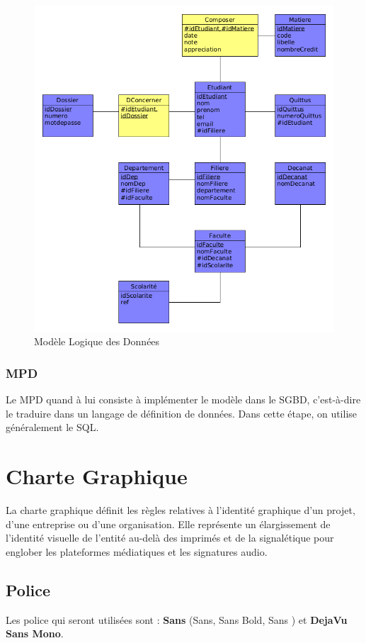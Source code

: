 \documentclass[12pt,a4paper]{article}
\begin{document}
	\begin{figure}[H]
		\centering
		\includegraphics[width=\textwidth]{./images/mld}
		\caption{Modèle Logique des Données}
		\label{fig:figure7}
	\end{figure}

	\subsubsection{MPD}
	Le MPD quand à lui consiste à implémenter le modèle dans le SGBD, c'est-à-dire le traduire dans un langage de définition de données. Dans cette étape, on utilise généralement le SQL.\\
	
	\newpage
	\section{Charte Graphique}
	La charte graphique définit les règles relatives à l'identité graphique d'un projet, d'une entreprise ou d'une organisation. Elle représente un élargissement de l'identité visuelle de l'entité au-delà des imprimés et de la signalétique pour englober les plateformes médiatiques et les signatures audio.
	
	\subsection{Police}
	Les police qui seront utilisées sont : \textbf{Sans} (Sans, Sans Bold, Sans ) et \textbf{DejaVu Sans Mono}.
	
\end{document}
